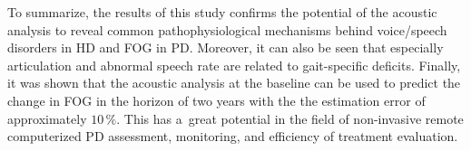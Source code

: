 To summarize, the results of this study confirms the potential of the acoustic analysis to reveal common pathophysiological mechanisms behind voice/speech disorders in HD and FOG in PD. Moreover, it can also be seen that especially articulation and abnormal speech rate are related to gait-specific deficits. Finally, it was shown that the acoustic analysis at the baseline can be used to predict the change in FOG in the horizon of two years with the the estimation error of approximately $10\,\%$. This has a~great potential in the field of non-invasive remote computerized PD assessment, monitoring, and efficiency of treatment evaluation.
